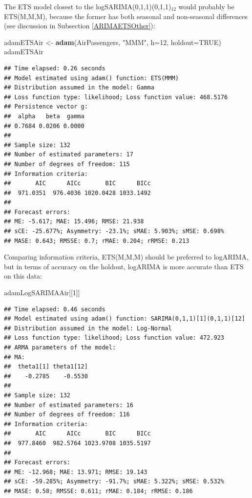 \documentclass[]{book}
\newenvironment{Shaded}{\begin{snugshade}}{\end{snugshade}}
\newcommand{\DataTypeTok}[1]{\textcolor[rgb]{0.13,0.29,0.53}{#1}}
\newcommand{\DecValTok}[1]{\textcolor[rgb]{0.00,0.00,0.81}{#1}}
\newcommand{\KeywordTok}[1]{\textcolor[rgb]{0.13,0.29,0.53}{\textbf{#1}}}
\newcommand{\NormalTok}[1]{#1}
\newcommand{\OtherTok}[1]{\textcolor[rgb]{0.56,0.35,0.01}{#1}}
\newcommand{\StringTok}[1]{\textcolor[rgb]{0.31,0.60,0.02}{#1}}
\theoremstyle{definition}
\theoremstyle{definition}
\theoremstyle{definition}
\theoremstyle{definition}
\theoremstyle{remark}
\begin{document}
The ETS model closest to the logSARIMA(0,1,1)(0,1,1)\(_{12}\) would probably be ETS(M,M,M), because the former has both seasonal and non-seasonal differences (see discussion in Subsection \ref{ARIMAETSOther}):

\begin{Shaded}
\begin{Highlighting}[]
\NormalTok{adamETSAir <-}\StringTok{ }\KeywordTok{adam}\NormalTok{(AirPassengers, }\StringTok{"MMM"}\NormalTok{, }\DataTypeTok{h=}\DecValTok{12}\NormalTok{, }\DataTypeTok{holdout=}\OtherTok{TRUE}\NormalTok{)}
\NormalTok{adamETSAir}
\end{Highlighting}
\end{Shaded}

\begin{verbatim}
## Time elapsed: 0.26 seconds
## Model estimated using adam() function: ETS(MMM)
## Distribution assumed in the model: Gamma
## Loss function type: likelihood; Loss function value: 468.5176
## Persistence vector g:
##  alpha   beta  gamma 
## 0.7684 0.0206 0.0000 
## 
## Sample size: 132
## Number of estimated parameters: 17
## Number of degrees of freedom: 115
## Information criteria:
##       AIC      AICc       BIC      BICc 
##  971.0351  976.4036 1020.0428 1033.1492 
## 
## Forecast errors:
## ME: -5.617; MAE: 15.496; RMSE: 21.938
## sCE: -25.677%; Asymmetry: -23.1%; sMAE: 5.903%; sMSE: 0.698%
## MASE: 0.643; RMSSE: 0.7; rMAE: 0.204; rRMSE: 0.213
\end{verbatim}

Comparing information criteria, ETS(M,M,M) should be preferred to logARIMA, but in terms of accuracy on the holdout, logARIMA is more accurate than ETS on this data:

\begin{Shaded}
\begin{Highlighting}[]
\NormalTok{adamLogSARIMAAir[[}\DecValTok{1}\NormalTok{]]}
\end{Highlighting}
\end{Shaded}

\begin{verbatim}
## Time elapsed: 0.46 seconds
## Model estimated using adam() function: SARIMA(0,1,1)[1](0,1,1)[12]
## Distribution assumed in the model: Log-Normal
## Loss function type: likelihood; Loss function value: 472.923
## ARMA parameters of the model:
## MA:
##  theta1[1] theta1[12] 
##    -0.2785    -0.5530 
## 
## Sample size: 132
## Number of estimated parameters: 16
## Number of degrees of freedom: 116
## Information criteria:
##       AIC      AICc       BIC      BICc 
##  977.8460  982.5764 1023.9708 1035.5197 
## 
## Forecast errors:
## ME: -12.968; MAE: 13.971; RMSE: 19.143
## sCE: -59.285%; Asymmetry: -91.7%; sMAE: 5.322%; sMSE: 0.532%
## MASE: 0.58; RMSSE: 0.611; rMAE: 0.184; rRMSE: 0.186
\end{verbatim}
\end{document}
